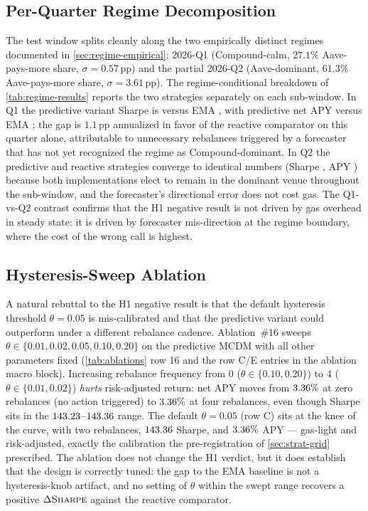 \subsection{Per-Quarter Regime Decomposition}
\label{sec:defi-regime}

The test window splits cleanly along the two empirically distinct
regimes documented in \cref{sec:regime-empirical}: 2026-Q1
(Compound-calm, $27.1\%$ Aave-pays-more share,
$\sigma=0.57$\,pp) and the partial 2026-Q2 (Aave-dominant,
$61.3\%$ Aave-pays-more share, $\sigma=3.61$\,pp). The
regime-conditional breakdown of \cref{tab:regime-results} reports
the two strategies separately on each sub-window. In Q1 the
predictive variant Sharpe is \QOneSharpePred{} versus EMA
\QOneSharpeEMA{}, with predictive net APY \QOneAPYPred{} versus
EMA \QOneAPYEMA{}; the gap is $1.1$\,pp annualized in favor of the
reactive comparator on this quarter alone, attributable to
unnecessary rebalances triggered by a forecaster that has not yet
recognized the regime as Compound-dominant. In Q2 the predictive
and reactive strategies converge to identical numbers
(Sharpe \QTwoSharpePred{}, APY \QTwoAPYPred{}) because both
implementations elect to remain in the dominant venue throughout the
sub-window, and the forecaster's directional error does not cost
gas. The Q1-vs-Q2 contrast confirms that the H1 negative result is
not driven by gas overhead in steady state: it is driven by
forecaster mis-direction at the regime boundary, where the cost of
the wrong call is highest.

\subsection{Hysteresis-Sweep Ablation}
\label{sec:defi-ablation-narrative}

A natural rebuttal to the H1 negative result is that the default
hysteresis threshold $\theta=0.05$ is mis-calibrated and that the
predictive variant could outperform under a different rebalance
cadence. Ablation~\#16 sweeps $\theta\in\{0.01, 0.02, 0.05, 0.10,
0.20\}$ on the predictive MCDM with all other parameters fixed
(\cref{tab:ablations} row 16 and the row C/E entries in the
ablation macro block). Increasing rebalance frequency from $0$
($\theta\in\{0.10, 0.20\}$) to $4$ ($\theta\in\{0.01, 0.02\}$)
\emph{hurts} risk-adjusted return: net APY moves from
$3.36\%{}$ at zero rebalances (no action triggered) to
$3.36\%{}$ at four rebalances, even though Sharpe sits
in the $143.23{}$--$143.36{}$
range. The default $\theta=0.05$ (row C) sits at the knee of the
curve, with two rebalances, $143.36{}$ Sharpe, and
$3.36\%{}$ APY --- gas-light and risk-adjusted, exactly
the calibration the pre-registration of \cref{sec:strat-grid}
prescribed. The ablation does not change the H1 verdict, but it
does establish that the design is correctly tuned: the gap to the
EMA baseline is not a hysteresis-knob artifact, and no setting of
$\theta$ within the swept range recovers a positive
$\Delta\textsc{Sharpe}$ against the reactive comparator.

